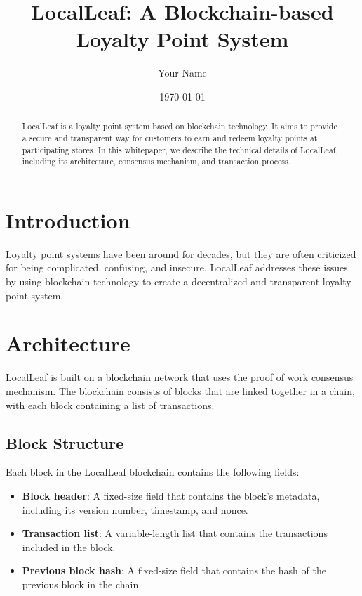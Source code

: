 \documentclass{article}
\title{LocalLeaf: A Blockchain-based Loyalty Point System}
\author{Your Name}
\date{\today}
\begin{document}
\maketitle

\begin{abstract}
    LocalLeaf is a loyalty point system based on blockchain technology. It aims to provide a secure and transparent way for customers to earn and redeem loyalty points at participating stores. In this whitepaper, we describe the technical details of LocalLeaf, including its architecture, consensus mechanism, and transaction process.
\end{abstract}

\section{Introduction}

Loyalty point systems have been around for decades, but they are often criticized for being complicated, confusing, and insecure. LocalLeaf addresses these issues by using blockchain technology to create a decentralized and transparent loyalty point system.

\section{Architecture}

LocalLeaf is built on a blockchain network that uses the proof of work consensus mechanism. The blockchain consists of blocks that are linked together in a chain, with each block containing a list of transactions.

\subsection{Block Structure}

Each block in the LocalLeaf blockchain contains the following fields:

\begin{itemize}
    \item \textbf{Block header}: A fixed-size field that contains the block's metadata, including its version number, timestamp, and nonce.
    \item \textbf{Transaction list}: A variable-length list that contains the transactions included in the block.
    \item \textbf{Previous block hash}: A fixed-size field that contains the hash of the previous block in the chain.
\end{itemize}
\end{document}
